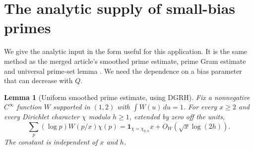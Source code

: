 \documentclass[11pt]{article}
\newtheorem{lemma}[theorem]{Lemma}
\theoremstyle{definition}\newtheorem{remark}[theorem]{Remark}
\newcommand{\ind}{\mathbf 1}
\newcommand{\GRH}{\textup{DGRH}}
\begin{document}
\section{The analytic supply of small-bias primes}
\label{sec:analytic}
We give the analytic input in the form useful for this application. It is the same method as the merged article's smoothed prime estimate, prime Gram estimate and universal prime-set lemma \cite[labels \texttt{dir:lem:smooth}, \texttt{rec:lem:gram}, \texttt{dir:lem:oneset}]{article}. We need the dependence on a bias parameter that can decrease with $Q$.

\begin{lemma}[Uniform smoothed prime estimate, using \GRH]\label{lem:prime}
Fix a nonnegative $C^\infty$ function $W$ supported in $(1,2)$ with $\int W(u)\,du=1$. For every $x\ge2$ and every Dirichlet character $\chi$ modulo $h\ge1$, extended by zero off the units,
\begin{equation}\label{eq:prime}
 \sum_p(\log p)W(p/x)\chi(p)
 =\ind_{\chi=\chi_{0,h}}x+O_W(\sqrt x\log(2h)).
\end{equation}
The constant is independent of $x$ and $h$.
\end{lemma}
\end{document}
